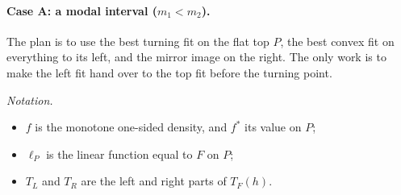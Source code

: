 \paragraph{Case A: a modal interval ($m_1<m_2$).} The plan is to use the best turning fit on the flat top $P$, the best convex fit on everything to its left, and the mirror image on the right. The only work is to make the left fit hand over to the top fit before the turning point.

\smallskip\noindent\emph{Notation.}
\begin{itemize}[leftmargin=*,itemsep=1pt]
\item $f$ is the monotone one-sided density, and $f^*$ its value on $P$;
\item $\ell_P$ is the linear function equal to $F$ on $P$;
\item $T_L$ and $T_R$ are the left and right parts of $T_F(h)$.
\end{itemize}

